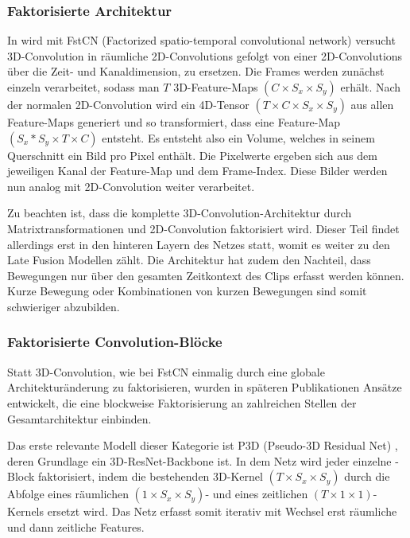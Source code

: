 \subsubsection{Faktorisierte Architektur}

In \cite{Sun15} wird mit FstCN (Factorized spatio-temporal convolutional network) versucht 3D-Convolution in räumliche 2D-Convolutions gefolgt von einer 2D-Convolutions über die Zeit- und Kanaldimension, zu ersetzen.
Die Frames werden zunächst einzeln verarbeitet, sodass man ${T}$ 3D-Feature-Maps $(C \times S_x \times S_y)$ erhält.
Nach der normalen 2D-Convolution wird ein 4D-Tensor $(T \times C \times S_x \times S_y)$ aus allen Feature-Maps generiert und so transformiert, dass eine Feature-Map $(S_x * S_y \times T \times C)$ entsteht.
Es entsteht also ein Volume, welches in seinem Querschnitt ein Bild pro Pixel enthält.
Die Pixelwerte ergeben sich aus dem jeweiligen Kanal der Feature-Map und dem Frame-Index.
Diese Bilder werden nun analog mit 2D-Convolution weiter verarbeitet.

Zu beachten ist, dass die komplette 3D-Convolution-Architektur durch Matrixtransformationen und 2D-Convolution faktorisiert wird.
Dieser Teil findet allerdings erst in den hinteren Layern des Netzes statt, womit es weiter zu den Late Fusion Modellen zählt.
Die Architektur hat zudem den Nachteil, dass Bewegungen nur über den gesamten Zeitkontext des Clips erfasst werden können.
Kurze Bewegung oder Kombinationen von kurzen Bewegungen sind somit schwieriger abzubilden.

\subsubsection{Faktorisierte Convolution-Blöcke}


Statt 3D-Convolution, wie bei FstCN einmalig durch eine globale Architekturänderung zu faktorisieren, wurden in späteren Publikationen Ansätze entwickelt, die eine blockweise Faktorisierung an zahlreichen Stellen der Gesamtarchitektur einbinden.

Das erste relevante Modell dieser Kategorie ist P3D (Pseudo-3D Residual Net) \cite{Qiu17}, deren Grundlage ein 3D-ResNet-Backbone ist.
In dem Netz wird jeder einzelne \res-Block faktorisiert, indem die bestehenden 3D-Kernel $(T \times S_x \times S_y)$ durch die Abfolge eines räumlichen $(1 \times S_x \times S_y)$- und eines zeitlichen $(T \times 1 \times 1)$-Kernels ersetzt wird.
Das Netz erfasst somit iterativ mit Wechsel erst räumliche und dann zeitliche Features.

